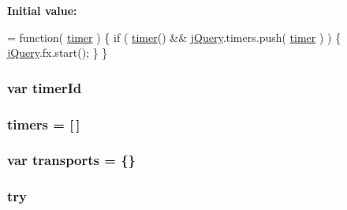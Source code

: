 {\bfseries Initial value\+:}
\begin{DoxyCode}
= \textcolor{keyword}{function}( \hyperlink{jquery-1_89_81_8js_a2b44b4db680ed005831a801cef9f8bb3}{timer} ) \{
    \textcolor{keywordflow}{if} ( \hyperlink{jquery-1_89_81_8js_a2b44b4db680ed005831a801cef9f8bb3}{timer}() && \hyperlink{jquery-1_89_81_8js_add5237586d970a38a81f990e8eb28c6c}{jQuery}.timers.push( \hyperlink{jquery-1_89_81_8js_a2b44b4db680ed005831a801cef9f8bb3}{timer} ) ) \{
        \hyperlink{jquery-1_89_81_8js_add5237586d970a38a81f990e8eb28c6c}{jQuery}.fx.start();
    \}
\}
\end{DoxyCode}
\hypertarget{jquery-1_89_81_8js_aa447439fbe7027e58837a297297c9d8a}{
\subsubsection[{timer\+Id}]{\setlength{\rightskip}{0pt plus 5cm}var timer\+Id}}\label{jquery-1_89_81_8js_aa447439fbe7027e58837a297297c9d8a}
\hypertarget{jquery-1_89_81_8js_a90bf6571856437dc2269be68a12c1d5a}{
\subsubsection[{timers}]{ timers = \mbox{[}$\,$\mbox{]}}}\label{jquery-1_89_81_8js_a90bf6571856437dc2269be68a12c1d5a}
\hypertarget{jquery-1_89_81_8js_ae354ef69102eb621a6b2ef6c9fc4d6a3}{
\subsubsection[{transports}]{\setlength{\rightskip}{0pt plus 5cm}var transports = \{\}}}\label{jquery-1_89_81_8js_ae354ef69102eb621a6b2ef6c9fc4d6a3}
\hypertarget{jquery-1_89_81_8js_abe4cc9788f52e49485473dc699537388}{
\subsubsection[{try}]{\setlength{\rightskip}{0pt plus 5cm}try}}\label{jquery-1_89_81_8js_abe4cc9788f52e49485473dc699537388}

